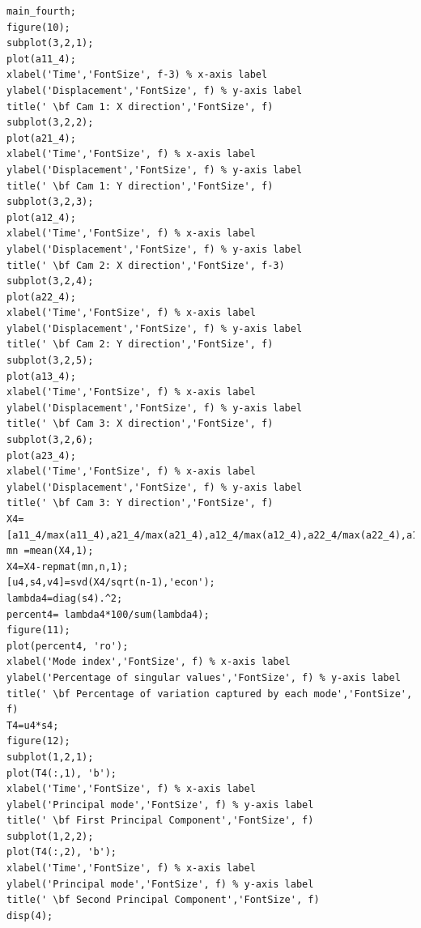 \documentclass[a4paper]{article}
\begin{document}
\begin{lstlisting}[style=myMatlabstyle]
main_fourth;
figure(10);
subplot(3,2,1);
plot(a11_4);
xlabel('Time','FontSize', f-3) % x-axis label
ylabel('Displacement','FontSize', f) % y-axis label
title(' \bf Cam 1: X direction','FontSize', f)
subplot(3,2,2);
plot(a21_4);
xlabel('Time','FontSize', f) % x-axis label
ylabel('Displacement','FontSize', f) % y-axis label
title(' \bf Cam 1: Y direction','FontSize', f)
subplot(3,2,3);
plot(a12_4);
xlabel('Time','FontSize', f) % x-axis label
ylabel('Displacement','FontSize', f) % y-axis label
title(' \bf Cam 2: X direction','FontSize', f-3)
subplot(3,2,4);
plot(a22_4);
xlabel('Time','FontSize', f) % x-axis label
ylabel('Displacement','FontSize', f) % y-axis label
title(' \bf Cam 2: Y direction','FontSize', f)
subplot(3,2,5);
plot(a13_4);
xlabel('Time','FontSize', f) % x-axis label
ylabel('Displacement','FontSize', f) % y-axis label
title(' \bf Cam 3: X direction','FontSize', f)
subplot(3,2,6);
plot(a23_4);
xlabel('Time','FontSize', f) % x-axis label
ylabel('Displacement','FontSize', f) % y-axis label
title(' \bf Cam 3: Y direction','FontSize', f)
X4=[a11_4/max(a11_4),a21_4/max(a21_4),a12_4/max(a12_4),a22_4/max(a22_4),a13_4/max(a13_4),a23_4/max(a23_4)];
mn =mean(X4,1);
X4=X4-repmat(mn,n,1);
[u4,s4,v4]=svd(X4/sqrt(n-1),'econ');
lambda4=diag(s4).^2;
percent4= lambda4*100/sum(lambda4);
figure(11);
plot(percent4, 'ro');
xlabel('Mode index','FontSize', f) % x-axis label
ylabel('Percentage of singular values','FontSize', f) % y-axis label
title(' \bf Percentage of variation captured by each mode','FontSize', f)
T4=u4*s4;
figure(12);
subplot(1,2,1);
plot(T4(:,1), 'b');
xlabel('Time','FontSize', f) % x-axis label
ylabel('Principal mode','FontSize', f) % y-axis label
title(' \bf First Principal Component','FontSize', f)
subplot(1,2,2);
plot(T4(:,2), 'b');
xlabel('Time','FontSize', f) % x-axis label
ylabel('Principal mode','FontSize', f) % y-axis label
title(' \bf Second Principal Component','FontSize', f)
disp(4);
\end{lstlisting}
\end{document}
